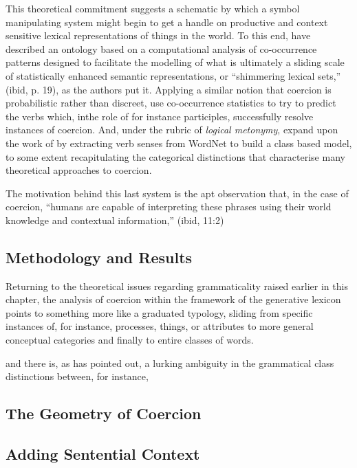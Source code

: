 This theoretical commitment suggests a schematic by which a symbol manipulating system might begin to get a handle on productive and context sensitive lexical representations of things in the world.  To this end, \cite{JezekEA2010} have described an ontology based on a computational analysis of co-occurrence patterns designed to facilitate the modelling of what is ultimately a sliding scale of statistically enhanced semantic representations, or ``shimmering lexical sets,'' (ibid, p. 19), as the authors put it.  Applying a similar notion that coercion is probabilistic rather than discreet, \cite{LapataEA2003} use co-occurrence statistics to try to predict the verbs which, inthe role of for instance participles, successfully resolve instances of coercion.  And, under the rubric of \emph{logical metonymy}, \cite{ShutovaEA2013b} expand upon the work of \citeauthor{LapataEA2003} by extracting verb senses from WordNet to build a class based model, to some extent recapitulating the categorical distinctions that characterise many theoretical approaches to coercion.

The motivation behind this last system is the apt observation that, in the case of coercion, ``humans are capable of interpreting these phrases using their world knowledge and contextual information,'' (ibid, 11:2)

\subsection{Methodology and Results}
Returning to the theoretical issues regarding grammaticality raised earlier in this chapter, the analysis of coercion within the framework of the generative lexicon points to something more like a graduated typology, sliding from specific instances of, for instance, processes, things, or attributes to more general conceptual categories and finally to entire classes of words.

and there is, as \cite{Langacker} has pointed out, a lurking ambiguity in the grammatical class distinctions between, for instance, 

\subsection{The Geometry of Coercion}

\subsection{Adding Sentential Context}

